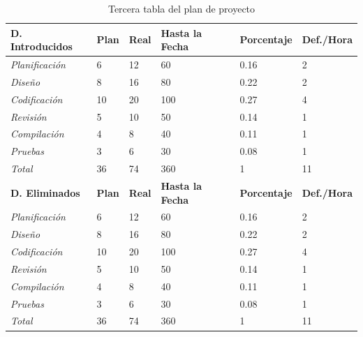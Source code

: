 \documentclass[a4paper,12pt,openany,oneside]{book}
\begin{document}
\newpage
\begin{table}
\begin{tabular}{| l | l | l | l | l | l |}
\hline
\textbf{D. Introducidos} & \textbf{Plan} & \textbf{Real} & \textbf{Hasta la Fecha} & \textbf{Porcentaje} & \textbf{Def./Hora} \\
\hline
\textit{Planificación} &  6 & 12 & 60 & 0.16 & 2\\
\hline
\textit{Diseño} &		  8 & 16 & 80 & 0.22 & 2\\
\hline
\textit{Codificación} &  10 & 20 &100 & 0.27 & 4\\
\hline
\textit{Revisión} &       5 & 10 & 50 & 0.14 & 1\\
\hline
\textit{Compilación} &    4 &  8 & 40 & 0.11 & 1\\
\hline
\textit{Pruebas} &        3 &  6 & 30 & 0.08 & 1\\
\hline
\textit{Total} &         36 & 74 & 360& 1 & 11 \\
\hline
\textbf{D. Eliminados} & \textbf{Plan} & \textbf{Real} & \textbf{Hasta la Fecha} & \textbf{Porcentaje} & \textbf{Def./Hora} \\
\hline
\textit{Planificación} &  6 & 12 & 60 & 0.16 & 2\\
\hline
\textit{Diseño} &		  8 & 16 & 80 & 0.22 & 2\\
\hline
\textit{Codificación} &  10 & 20 &100 & 0.27 & 4\\
\hline
\textit{Revisión} &       5 & 10 & 50 & 0.14 & 1\\
\hline
\textit{Compilación} &    4 &  8 & 40 & 0.11 & 1\\
\hline
\textit{Pruebas} &        3 &  6 & 30 & 0.08 & 1\\
\hline
\textit{Total} &         36 & 74 & 360& 1 & 11 \\
\hline
\end{tabular}
\caption{Tercera tabla del plan de proyecto}
\end{table}
\end{document}
